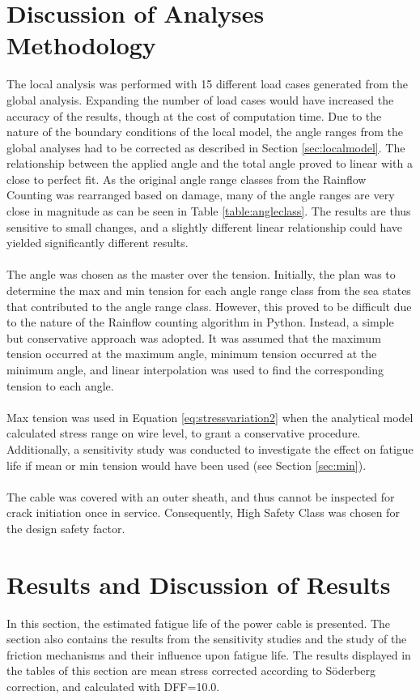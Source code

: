 \section{Discussion of Analyses Methodology}
The local analysis was performed with 15 different load cases generated from the global analysis. Expanding the number of load cases would have increased the accuracy of the results, though at the cost of computation time. Due to the nature of the boundary conditions of the local model, the angle ranges from the global analyses had to be corrected as described in Section \ref{sec:localmodel}. The relationship between the applied angle and the total angle proved to linear with a close to perfect fit. As the original angle range classes from the Rainflow Counting was rearranged based on damage, many of the angle ranges are very close in magnitude as can be seen in Table \ref{table:angleclass}. The results are thus sensitive to small changes, and a slightly different linear relationship could have yielded significantly different results. \\\\ The angle was chosen as the master over the tension. Initially, the plan was to determine the max and min tension for each angle range class from the sea states that contributed to the angle range class. However, this proved to be difficult due to the nature of the Rainflow counting algorithm in Python. Instead, a simple but conservative approach was adopted. It was assumed that the maximum tension occurred at the maximum angle, minimum tension occurred at the minimum angle, and linear interpolation was used to find the corresponding tension to each angle.\\\\ Max tension was used in Equation \ref{eq:stressvariation2} when the analytical model calculated stress range on wire level, to grant a conservative procedure. Additionally, a sensitivity study was conducted to investigate the effect on fatigue life if mean or min tension would have been used (see Section \ref{sec:min}). \\\\ The cable was covered with an outer sheath, and thus cannot be inspected for crack initiation once in service. Consequently, High Safety Class was chosen for the design safety factor. 

\section{Results and Discussion of Results}
In this section, the estimated fatigue life of the power cable is presented. The section also contains the results from the sensitivity studies and the study of the friction mechanisms and their influence upon fatigue life. The results displayed in the tables of this section are mean stress corrected according to Söderberg correction, and calculated with DFF=10.0.\\\\
